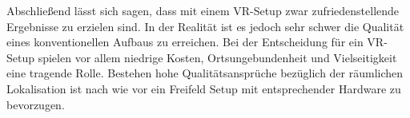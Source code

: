 

%
Abschließend lässt sich sagen, dass mit einem VR-Setup zwar zufriedenstellende Ergebnisse zu erzielen sind. In der Realität ist es jedoch sehr schwer die Qualität eines konventionellen Aufbaus zu erreichen. Bei der Entscheidung für ein VR-Setup spielen vor allem niedrige Kosten, Ortsungebundenheit und Vielseitigkeit eine tragende Rolle. Bestehen hohe Qualitätsansprüche bezüglich der räumlichen Lokalisation ist nach wie vor ein Freifeld Setup mit entsprechender Hardware zu bevorzugen.